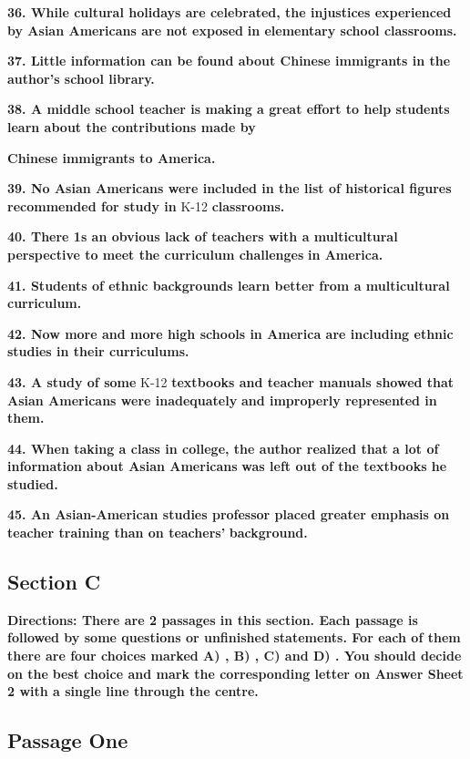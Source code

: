 \documentclass[UTF8,11pt]{ctexart}
\begin{document}
\textbf{36. While cultural holidays are celebrated, the injustices experienced by Asian Americans are not exposed} \textbf{in elementary school classrooms.}


\textbf{37. Little information can be found about Chinese immigrants in the author's school library.}


\textbf{38. A middle school teacher is making a great effort to help students learn about the contributions made by}


\textbf{Chinese immigrants to America.}


\textbf{39. No Asian Americans were included in the list of historical figures recommended for study in }K-12 \textbf{classrooms.}


\textbf{40. There 1s an obvious lack of teachers with a multicultural perspective to meet the curriculum challenges} \textbf{in America.}


\textbf{41. Students of ethnic backgrounds learn better from a multicultural curriculum.}


\textbf{42. Now more and more high schools in America are including ethnic studies in their curriculums.}


\textbf{43. A study of some }K-12 \textbf{textbooks and teacher manuals showed that Asian Americans were inadequately} \textbf{and improperly represented in them.}


\textbf{44. When taking a class in college, the author realized that a lot of information about Asian Americans} \textbf{was left out of the textbooks he studied.}


\textbf{45. An Asian-American studies professor placed greater emphasis on teacher training than on teachers'} \textbf{background.}


\subsection*{Section C}


\textbf{Directions: There are 2 passages in this section. Each passage is followed by some questions or unfinished} \textbf{statements. For each of them there are four choices marked A) , B) , C) and D) . You should decide on the} \textbf{best choice and mark the corresponding letter on Answer Sheet 2 with a single line through the centre.}


\subsection*{\textbf{Passage One}}
\end{document}
